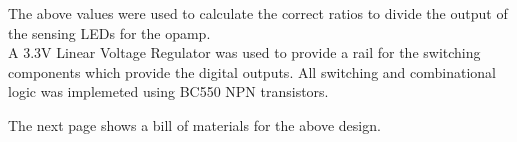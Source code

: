 \begin{homeworkProblem}
\begin{table}[h]
\end{table}

The above values were used to calculate the correct ratios to divide the output of the sensing LEDs for the opamp.\\

A 3.3V Linear Voltage Regulator was used to provide a rail for the switching components which provide the digital outputs.  All switching and combinational logic was implemeted using BC550 NPN transistors.

\end{homeworkProblem}

\begin{homeworkProblem}
The next page shows a bill of materials for the above design.

\end{homeworkProblem}







